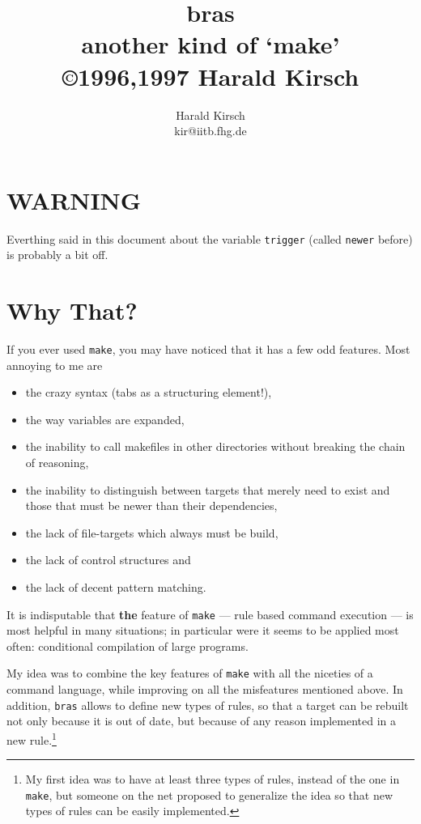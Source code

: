 \documentclass[12pt]{article}
\title{\textsf{bras}\\
another kind of `make'\\
\small \copyright 1996,1997 Harald Kirsch}
\author{\relax
Harald Kirsch\\
kir@iitb.fhg.de}
\newcommand{\bras}{\texttt{bras}}
\newcommand{\make}{\texttt{make}}
\begin{document}
\maketitle
\tableofcontents

\section*{WARNING}
Everthing said in this document about the variable \texttt{trigger}
(called \texttt{newer} before) is probably a bit off.


\section{Why That?}
If you ever used \texttt{make}, you may have noticed that it has a few
odd features. Most annoying to me are
\begin{itemize}
\item the crazy syntax (tabs as a structuring element!),
\item the way variables are expanded,
\item the inability to call makefiles in other directories without
breaking the chain of reasoning,
\item the inability to distinguish between targets that merely need to
  exist and those that must be newer than their dependencies,
\item the lack of file-targets which always must be build,
\item the lack of control structures and 
\item the lack of decent pattern matching.
\end{itemize}

It is indisputable that \textbf{the} feature of \texttt{make} ---
rule based command execution --- is most helpful in many situations;
in particular were it seems to be applied most often:
conditional compilation of large programs.

My idea was to combine the key features of \texttt{make} with all the
niceties of a command language, while improving on all the misfeatures
mentioned above. In addition, \bras{} allows to define new types of
rules, so that a target can be rebuilt not only because it is out of
date, but because of any reason implemented in a new rule.\footnote{My
first idea was to have at least three types of rules, instead of the one
in \make{}, but someone on the net proposed to generalize the idea so
that new types of rules can be easily implemented.}
\end{document}
